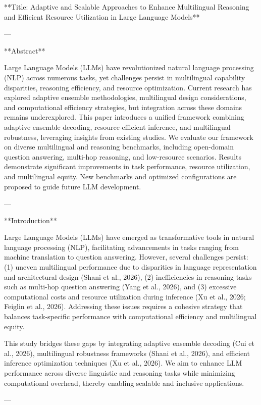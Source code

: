 **Title: Adaptive and Scalable Approaches to Enhance Multilingual Reasoning and Efficient Resource Utilization in Large Language Models**

---

**Abstract**

Large Language Models (LLMs) have revolutionized natural language processing (NLP) across numerous tasks, yet challenges persist in multilingual capability disparities, reasoning efficiency, and resource optimization. Current research has explored adaptive ensemble methodologies, multilingual design considerations, and computational efficiency strategies, but integration across these domains remains underexplored. This paper introduces a unified framework combining adaptive ensemble decoding, resource-efficient inference, and multilingual robustness, leveraging insights from existing studies. We evaluate our framework on diverse multilingual and reasoning benchmarks, including open-domain question answering, multi-hop reasoning, and low-resource scenarios. Results demonstrate significant improvements in task performance, resource utilization, and multilingual equity. New benchmarks and optimized configurations are proposed to guide future LLM development. 

---

**Introduction**

Large Language Models (LLMs) have emerged as transformative tools in natural language processing (NLP), facilitating advancements in tasks ranging from machine translation to question answering. However, several challenges persist: (1) uneven multilingual performance due to disparities in language representation and architectural design (Shani et al., 2026), (2) inefficiencies in reasoning tasks such as multi-hop question answering (Yang et al., 2026), and (3) excessive computational costs and resource utilization during inference (Xu et al., 2026; Feiglin et al., 2026). Addressing these issues requires a cohesive strategy that balances task-specific performance with computational efficiency and multilingual equity.

This study bridges these gaps by integrating adaptive ensemble decoding (Cui et al., 2026), multilingual robustness frameworks (Shani et al., 2026), and efficient inference optimization techniques (Xu et al., 2026). We aim to enhance LLM performance across diverse linguistic and reasoning tasks while minimizing computational overhead, thereby enabling scalable and inclusive applications.

---

